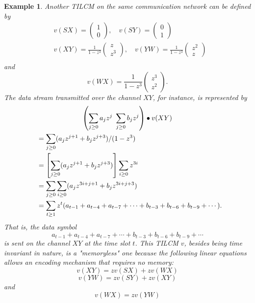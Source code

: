 \documentclass[journal]{IEEEtran}
\newtheorem{exam}[prop]{Example}
\begin{document}
\begin{exam}
	Another TILCM on the same communication	network can be defined by
	\begin{align*}
	&v(SX)=\begin{pmatrix} 1 \\ 0 \end{pmatrix},\quad v(SY)=\begin{pmatrix} 0 \\ 1 \end{pmatrix}\\
	&v(XY)=\frac{1}{1-z^3}\begin{pmatrix} z \\ z^3 \end{pmatrix}, \quad v(YW)=\frac{1}{1-z^3}\begin{pmatrix} z^2 \\ z \end{pmatrix}\\
	\end{align*}
	and
	$$v(WX)=\frac{1}{1-z^3}\begin{pmatrix} z^3\\ z^2\end{pmatrix}.$$
	The data stream transmitted over the channel $XY$, for instance, is represented by
	\begin{multline*}
	\left(\sum_{j\geq 0}a_jz^j\ \sum_{j\geq 0}b_jz^j\right)\bullet v(XY)\\ \shoveleft
	=\sum_{j\geq 0}(a_jz^{j+1}+b_jz^{j+3})/(1-z^3)\\ \shoveleft
	=\left[ \sum_{j\geq 0}(a_jz^{j+1}+b_jz^{j+3})\right]\sum_{i\geq 0}z^{3i}\\ \shoveleft
	=\sum_{j\geq 0}\sum_{i\geq 0}(a_jz^{3i+j+1}+b_jz^{3i+j+3})\\ \shoveleft
	=\sum_{t\geq 1}z^t(a_{t-1}+a_{t-4}+a_{t-7}+ \cdots +b_{t-3}+b_{t-6}+b_{t-9}+\cdots).
	\end{multline*}
That is, the data symbol
$$a_{t-1}+a_{t-4}+a_{t-7}+ \cdots +b_{t-3}+b_{t-6}+b_{t-9}+\cdots$$
is sent on the channel $XY$ at the time slot $t$. This TILCM $v$, besides being time invariant in nature, is a "memoryless" one because the following linear equations allows an encoding mechanism that requires no memory:
$$v(XY)=zv(SX)+zv(WX)$$
$$v(YW)=zv(SY)+zv(XY)$$
and
$$v(WX)=zv(YW)$$
\end{exam}
\end{document}
